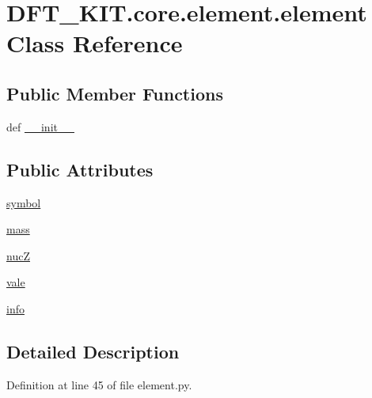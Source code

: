 \hypertarget{class_d_f_t___k_i_t_1_1core_1_1element_1_1element}{\section{D\+F\+T\+\_\+\+K\+I\+T.\+core.\+element.\+element Class Reference}
\label{class_d_f_t___k_i_t_1_1core_1_1element_1_1element}
}
\subsection*{Public Member Functions}
\begin{DoxyCompactItemize}
\item 
def \hyperlink{class_d_f_t___k_i_t_1_1core_1_1element_1_1element_a6b8ca9cda88a43aff0d4fae80d3e06f3}{\+\_\+\+\_\+init\+\_\+\+\_\+}
\end{DoxyCompactItemize}
\subsection*{Public Attributes}
\begin{DoxyCompactItemize}
\item 
\hyperlink{class_d_f_t___k_i_t_1_1core_1_1element_1_1element_ab2919368378ec5a3c88f561701437ca0}{symbol}
\item 
\hyperlink{class_d_f_t___k_i_t_1_1core_1_1element_1_1element_a798861de085eb85aebbcdedd54371731}{mass}
\item 
\hyperlink{class_d_f_t___k_i_t_1_1core_1_1element_1_1element_a9fdfc898296fd99c70addb3a7f9d7616}{nuc\+Z}
\item 
\hyperlink{class_d_f_t___k_i_t_1_1core_1_1element_1_1element_af0b4a1138ddc637879efb7f1dfc96630}{vale}
\item 
\hyperlink{class_d_f_t___k_i_t_1_1core_1_1element_1_1element_a351a8d8ba25af9024aee42cec88fc993}{info}
\end{DoxyCompactItemize}


\subsection{Detailed Description}


Definition at line 45 of file element.\+py.



